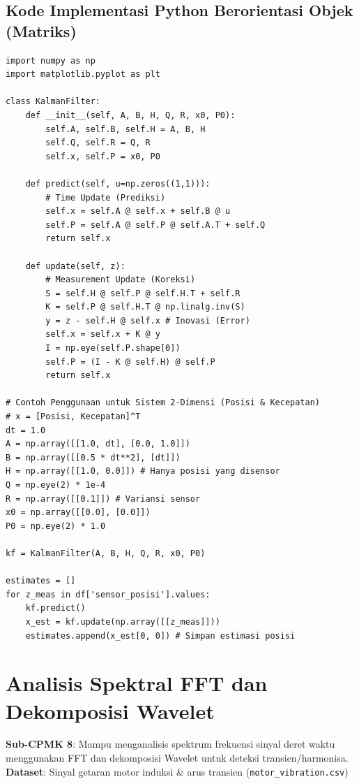 \documentclass[11pt,a4paper]{report}
\begin{document}
\section{Kode Implementasi Python Berorientasi Objek (Matriks)}
\begin{lstlisting}
import numpy as np
import matplotlib.pyplot as plt

class KalmanFilter:
    def __init__(self, A, B, H, Q, R, x0, P0):
        self.A, self.B, self.H = A, B, H
        self.Q, self.R = Q, R
        self.x, self.P = x0, P0

    def predict(self, u=np.zeros((1,1))):
        # Time Update (Prediksi)
        self.x = self.A @ self.x + self.B @ u
        self.P = self.A @ self.P @ self.A.T + self.Q
        return self.x

    def update(self, z):
        # Measurement Update (Koreksi)
        S = self.H @ self.P @ self.H.T + self.R
        K = self.P @ self.H.T @ np.linalg.inv(S)
        y = z - self.H @ self.x # Inovasi (Error)
        self.x = self.x + K @ y
        I = np.eye(self.P.shape[0])
        self.P = (I - K @ self.H) @ self.P
        return self.x

# Contoh Penggunaan untuk Sistem 2-Dimensi (Posisi & Kecepatan)
# x = [Posisi, Kecepatan]^T
dt = 1.0
A = np.array([[1.0, dt], [0.0, 1.0]])
B = np.array([[0.5 * dt**2], [dt]])
H = np.array([[1.0, 0.0]]) # Hanya posisi yang disensor
Q = np.eye(2) * 1e-4
R = np.array([[0.1]]) # Variansi sensor
x0 = np.array([[0.0], [0.0]])
P0 = np.eye(2) * 1.0

kf = KalmanFilter(A, B, H, Q, R, x0, P0)

estimates = []
for z_meas in df['sensor_posisi'].values:
    kf.predict()
    x_est = kf.update(np.array([[z_meas]]))
    estimates.append(x_est[0, 0]) # Simpan estimasi posisi
\end{lstlisting}

\newpage

\chapter{Analisis Spektral FFT dan Dekomposisi Wavelet}

\begin{tcolorbox}[title=Informasi Modul 8]
\textbf{Sub-CPMK 8}: Mampu menganalisis spektrum frekuensi sinyal deret waktu menggunakan FFT dan dekomposisi Wavelet untuk deteksi transien/harmonisa.\\
\textbf{Dataset}: Sinyal getaran motor induksi \& arus transien (\texttt{motor\_vibration.csv})
\end{tcolorbox}
\end{document}
